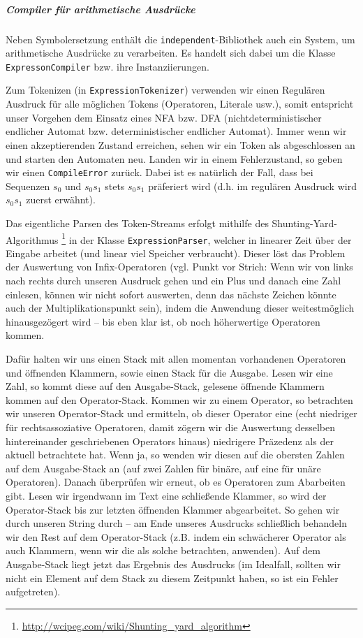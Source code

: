 \subparagraph{Compiler für arithmetische Ausdrücke} Neben Symbolersetzung
enthält die \texttt{independent}-Bibliothek auch ein System, um arithmetische
Ausdrücke zu verarbeiten. Es handelt sich dabei um die Klasse
\texttt{ExpressonCompiler} bzw. ihre Instanziierungen.

Zum Tokenizen (in \texttt{ExpressionTokenizer}) verwenden wir einen Regulären
Ausdruck für alle möglichen Tokens (Operatoren, Literale usw.), somit entspricht
unser Vorgehen dem Einsatz eines NFA bzw. DFA (nichtdeterministischer endlicher
Automat bzw. deterministischer endlicher Automat). Immer wenn wir einen
akzeptierenden Zustand erreichen, sehen wir ein Token als abgeschlossen an und
starten den Automaten neu. Landen wir in einem Fehlerzustand, so geben wir einen
\texttt{CompileError} zurück. Dabei ist es natürlich der Fall, dass bei
Sequenzen $s_0$ und $s_0s_1$ stets $s_0s_1$ präferiert wird (d.h. im
regulären Ausdruck wird $s_0s_1$ zuerst erwähnt).

Das eigentliche Parsen des Token-Streams erfolgt mithilfe des
Shunting-Yard-Algorithmus \footnote{\url{http://wcipeg.com/wiki/Shunting_yard_algorithm}} in
der Klasse \texttt{ExpressionParser}, welcher in linearer Zeit über der Eingabe
arbeitet (und linear viel Speicher verbraucht). Dieser löst das Problem der
Auswertung von Infix-Operatoren (vgl. Punkt vor Strich: Wenn wir von links nach
rechts durch unseren Ausdruck gehen und ein Plus und danach eine Zahl einlesen,
können wir nicht sofort auswerten, denn das nächste Zeichen könnte auch der
Multiplikationspunkt sein), indem die Anwendung dieser weitestmöglich
hinausgezögert wird -- bis eben klar ist, ob noch höherwertige Operatoren kommen.

Dafür halten wir uns einen Stack mit allen momentan vorhandenen Operatoren und
öffnenden Klammern, sowie einen Stack für die Ausgabe. Lesen wir eine Zahl, so
kommt diese auf den Ausgabe-Stack, gelesene öffnende Klammern kommen auf den
Operator-Stack. Kommen wir zu einem Operator, so betrachten wir unseren
Operator-Stack und ermitteln, ob dieser Operator eine (echt niedriger für
rechtsassoziative Operatoren, damit zögern wir die Auswertung desselben
hintereinander geschriebenen Operators hinaus) niedrigere Präzedenz als der
aktuell betrachtete hat. Wenn ja, so wenden wir diesen auf die obersten Zahlen
auf dem Ausgabe-Stack an (auf zwei Zahlen für binäre, auf eine für unäre
Operatoren). Danach überprüfen wir erneut, ob es Operatoren zum Abarbeiten gibt.
Lesen wir irgendwann im Text eine schließende Klammer, so wird der
Operator-Stack bis zur letzten öffnenden Klammer abgearbeitet. So gehen wir
durch unseren String durch – am Ende unseres Ausdrucks schließlich behandeln wir
den Rest auf dem Operator-Stack (z.B. indem ein schwächerer Operator als auch
Klammern, wenn wir die als solche betrachten, anwenden). Auf dem Ausgabe-Stack
liegt jetzt das Ergebnis des Ausdrucks (im Idealfall, sollten wir nicht ein
Element auf dem Stack zu diesem Zeitpunkt haben, so ist ein Fehler aufgetreten).

